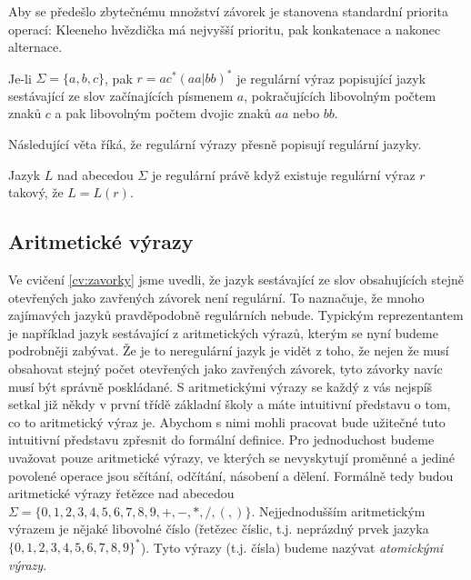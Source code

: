 Aby se předešlo zbytečnému množství závorek je stanovena standardní priorita operací: Kleeneho  hvězdička má nejvyšší prioritu, pak konkatenace a
nakonec alternace.

\begin{example} Je-li \(\Sigma=\{a,b,c\}\), pak \(r=ac^*(aa|bb)^*\) je regulární výraz popisující jazyk sestávající ze slov začínajících písmenem \(a\), pokračujících libovolným počtem znaků \(c\)
a pak libovolným počtem dvojic znaků \(aa\) nebo \(bb\).
\end{example}

Následující věta říká, že regulární výrazy přesně popisují regulární jazyky.

\begin{theorem} Jazyk \(L\) nad abecedou \(\Sigma\) je regulární právě když existuje regulární výraz \(r\) takový, že \(L=L(r)\).
\end{theorem}


\subsection*{Aritmetické výrazy}
Ve cvičení \ref{cv:zavorky} jsme uvedli, že jazyk sestávající ze slov obsahujících
stejně otevřených jako zavřených závorek není regulární. To naznačuje, že
mnoho zajímavých jazyků pravděpodobně regulárních nebude. Typickým reprezentantem
je například jazyk sestávající z aritmetických výrazů, kterým se nyní budeme
podrobněji zabývat. Že je to neregulární jazyk je vidět z toho, že nejen že
musí obsahovat stejný počet otevřených jako zavřených závorek, tyto závorky
navíc musí být správně poskládané. S aritmetickými výrazy se každý z vás nejspíš
setkal již někdy v první třídě základní školy a máte intuitivní představu o tom,
co to aritmetický výraz je. Abychom s nimi mohli pracovat bude užitečné tuto
intuitivní představu zpřesnit do formální definice. Pro jednoduchost budeme
uvažovat pouze aritmetické výrazy, ve kterých se nevyskytují proměnné a jediné
povolené operace jsou sčítání, odčítání, násobení a dělení. Formálně tedy budou
aritmetické výrazy řetězce nad abecedou
\(\Sigma = \{0,1,2,3,4,5,6,7,8,9,+,-,*,/,(,)\}\). Nejjednodušším
aritmetickým výrazem je nějaké libovolné číslo (řetězec číslic, t.j.
neprázdný prvek jazyka \(\{0,1,2,3,4,5,6,7,8,9\}^*\)).
Tyto výrazy (t.j. čísla) budeme nazývat \emph{atomickými výrazy}.

